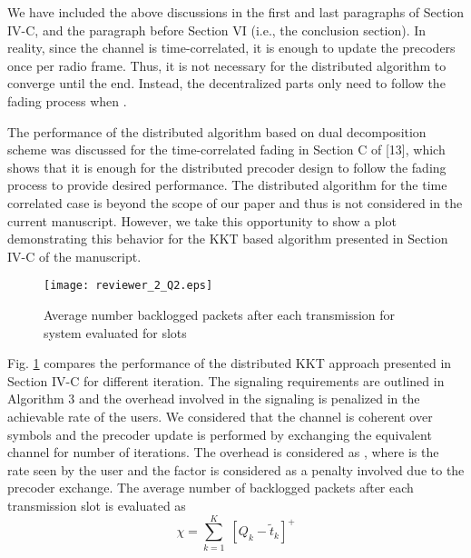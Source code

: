 \begin{enumerate}
\begin{enumerate}
	\end{enumerate}
	
	We have included the above discussions in the first and last paragraphs of Section IV-C, and the paragraph before Section VI (i.e., the conclusion section). In reality, since the channel is time-correlated, it is enough to update the precoders once per radio frame. Thus, it is not necessary for the distributed algorithm to converge until the end. Instead, the decentralized parts only need to follow the fading process when . 
	
	The performance of the distributed algorithm based on dual decomposition scheme was discussed for the time-correlated fading in Section C of [13], which shows that it is enough for the distributed precoder design to follow the fading process to provide desired performance. The distributed algorithm for the time correlated case is beyond the scope of our paper and thus is not considered in the current manuscript. However, we take this opportunity to show a plot demonstrating this behavior for the \ac{KKT} based algorithm presented in Section IV-C of the manuscript.
	\begin{figure}[h!]
		\centering
		\texttt{[image: reviewer\_2\_Q2.eps]}
		\caption{Average number backlogged packets after each transmission for system  evaluated for  slots}
		\label{fig-review-2}
	\end{figure}
		
	Fig. \ref{fig-review-2} compares the performance of the distributed \ac{KKT} approach presented in Section IV-C for different iteration. The signaling requirements are outlined in Algorithm 3 and the overhead involved in the signaling is penalized in the achievable rate of the users. We considered that the channel is coherent over  symbols and the precoder update is performed by exchanging the equivalent channel for  number of iterations. The overhead is considered as , where  is the rate seen by the user and the factor  is considered as a penalty involved due to the precoder exchange. The average number of backlogged packets after each transmission slot is evaluated as 
	\begin{equation}
	\chi = \sum_{k = 1}^K \; [ Q_k - \tilde{t}_k ]^+
	\end{equation}
	

\end{enumerate}
